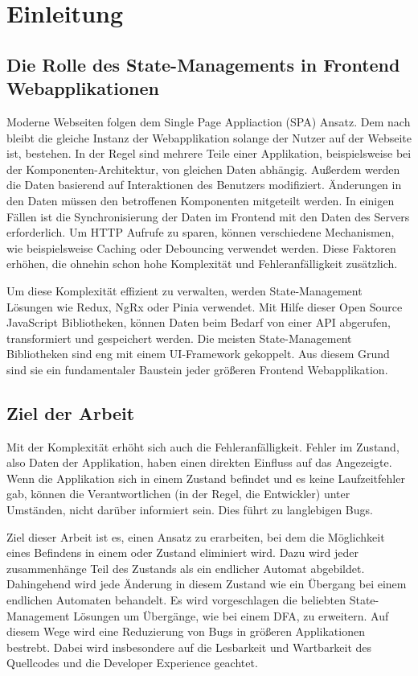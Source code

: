 \chapter{Einleitung}

\section{Die Rolle des State-Managements in Frontend Webapplikationen}

Moderne Webseiten folgen dem Single Page Appliaction (SPA) Ansatz. Dem nach bleibt die gleiche Instanz der Webapplikation solange der Nutzer auf der Webseite ist, bestehen. In der Regel sind mehrere Teile einer Applikation, beispielsweise bei der Komponenten-Architektur, von gleichen Daten abhängig. Außerdem werden die Daten basierend auf Interaktionen des Benutzers modifiziert. Änderungen in den Daten müssen den betroffenen Komponenten mitgeteilt werden. In einigen Fällen ist die Synchronisierung der Daten im Frontend mit den Daten des Servers erforderlich. Um HTTP Aufrufe zu sparen, können verschiedene Mechanismen, wie beispielsweise Caching oder Debouncing verwendet werden. Diese Faktoren erhöhen, die ohnehin schon hohe Komplexität und Fehleranfälligkeit zusätzlich.

Um diese Komplexität effizient zu verwalten, werden State-Management Lösungen wie Redux, NgRx oder Pinia verwendet. Mit Hilfe dieser Open Source JavaScript Bibliotheken, können Daten beim Bedarf von einer API abgerufen, transformiert und gespeichert werden. Die meisten State-Management Bibliotheken sind eng mit einem UI-Framework gekoppelt. Aus diesem Grund sind sie ein fundamentaler Baustein jeder größeren Frontend Webapplikation.

\section{Ziel der Arbeit}

Mit der Komplexität erhöht sich auch die Fehleranfälligkeit. Fehler im Zustand, also Daten der Applikation, haben einen direkten Einfluss auf das Angezeigte. Wenn die Applikation sich in einem  Zustand befindet und es keine Laufzeitfehler gab, können die Verantwortlichen (in der Regel, die Entwickler) unter Umständen, nicht darüber informiert sein. Dies führt zu langlebigen Bugs.

Ziel dieser Arbeit ist es, einen Ansatz zu erarbeiten, bei dem die Möglichkeit eines Befindens in einem  oder  Zustand eliminiert wird. Dazu wird jeder zusammenhänge Teil des Zustands als ein endlicher Automat abgebildet. Dahingehend wird jede Änderung in diesem Zustand wie ein Übergang bei einem endlichen Automaten behandelt. Es wird vorgeschlagen die beliebten State-Management Lösungen um  Übergänge, wie bei einem DFA, zu erweitern. Auf diesem Wege wird eine Reduzierung von Bugs in größeren Applikationen bestrebt. Dabei wird insbesondere auf die Lesbarkeit und Wartbarkeit des Quellcodes und die Developer Experience geachtet.

